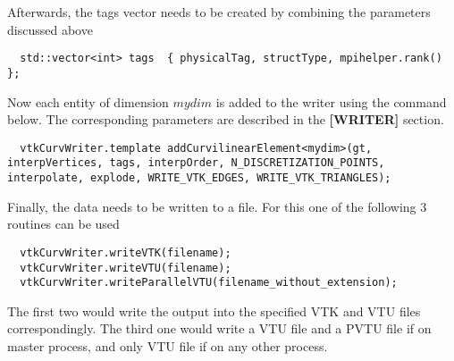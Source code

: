 \noindent
Afterwards, the tags vector needs to be created by combining the parameters discussed above

\begin{mybox}
\begin{lstlisting}
  std::vector<int> tags  { physicalTag, structType, mpihelper.rank() };
\end{lstlisting}
\end{mybox}

\noindent
Now each entity of dimension $mydim$ is added to the writer using the command below. The corresponding parameters are described in the \textbf{[WRITER]} section. \\

\begin{mybox}
\begin{lstlisting}
  vtkCurvWriter.template addCurvilinearElement<mydim>(gt, interpVertices, tags, interpOrder, N_DISCRETIZATION_POINTS, interpolate, explode, WRITE_VTK_EDGES, WRITE_VTK_TRIANGLES);
\end{lstlisting}
\end{mybox}

\noindent
Finally, the data needs to be written to a file. For this one of the following 3 routines can be used \\

\begin{mybox}
\begin{lstlisting}
  vtkCurvWriter.writeVTK(filename);
  vtkCurvWriter.writeVTU(filename);
  vtkCurvWriter.writeParallelVTU(filename_without_extension);
\end{lstlisting}
\end{mybox}

\noindent
The first two would write the output into the specified VTK and VTU files correspondingly. The third one would write a VTU file and a PVTU file if on master process, and only VTU file if on any other process.